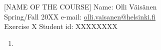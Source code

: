 \documentclass[a4paper, twoside, 12pt]{artikel3} %
\begin{document}
\pagestyle{empty} 
[NAME OF THE COURSE] \hfill Name: Olli Väisänen\\%
Spring/Fall 20XX \hfill e-mail: \href{mailto:olli.vaisanen@helsinki.fi}{olli.vaisanen@helsinki.fi} \\
Exercise X \hfill  Student id: XXXXXXXX \\%

\begin{enumerate}[Prob. 1.] \itemsep12pt
	\item %
\end{enumerate}
\end{document}
